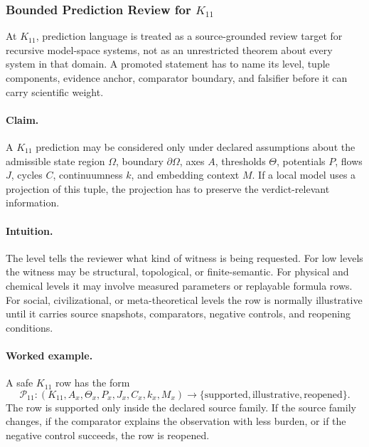 \subsubsection{Bounded Prediction Review for \texorpdfstring{$K_11$}{K_11}}
\label{sec:predictions-k11-r014}

At \(K_11\), prediction language is treated as a source-grounded review
target for recursive model-space systems, not as an unrestricted theorem about every system in that
domain. A promoted statement has to name its level, tuple components, evidence
anchor, comparator boundary, and falsifier before it can carry scientific
weight.

\paragraph{Claim.}
A \(K_11\) prediction may be considered only under declared assumptions
about the admissible state region \(\Omega\), boundary \(\partial\Omega\), axes
\(A\), thresholds \(\Theta\), potentials \(P\), flows \(J\), cycles \(C\),
continuumness \(k\), and embedding context \(M\). If a local model uses a
projection of this tuple, the projection has to preserve the verdict-relevant
information.

\paragraph{Intuition.}
The level tells the reviewer what kind of witness is being requested. For low
levels the witness may be structural, topological, or finite-semantic. For
physical and chemical levels it may involve measured parameters or replayable
formula rows. For social, civilizational, or meta-theoretical levels the row is
normally illustrative until it carries source snapshots, comparators, negative
controls, and reopening conditions.

\paragraph{Worked example.}
A safe \(K_11\) row has the form
\[
  \mathcal{P}_{11}:
  (K_11, A_x, \Theta_x, P_x, J_x, C_x, k_x, M_x)
  \longrightarrow
  \{\mathrm{supported},\mathrm{illustrative},\mathrm{reopened}\}.
\]
The row is supported only inside the declared source family. If the source
family changes, if the comparator explains the observation with less burden, or
if the negative control succeeds, the row is reopened.

